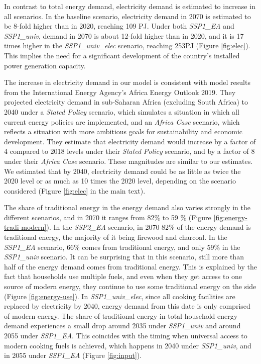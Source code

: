 \documentclass[
]{article}
\begin{document}
In contrast to total energy demand, electricity demand is estimated to increase in all scenarios. In the baseline scenario, electricity demand in 2070 is estimated to be 8-fold higher than in 2020, reaching 109 PJ. Under both \emph{SSP1\_EA} and \emph{SSP1\_univ}, demand in 2070 is about 12-fold higher than in 2020, and it is 17 times higher in the \emph{SSP1\_univ\_elec} scenario, reaching 253PJ (Figure \ref{fig:elec}). This implies the need for a significant development of the country's installed power generation capacity.

The increase in electricity demand in our model is consistent with model results from the International Energy Agency's Africa Energy Outlook 2019. They projected electricity demand in sub-Saharan Africa (excluding South Africa) to 2040 under a \emph{Stated Policy} scenario, which simulates a situation in which all current energy policies are implemented, and an \emph{Africa Case} scenario, which reflects a situation with more ambitious goals for sustainability and economic development. They estimate that electricity demand would increase by a factor of 4 compared to 2018 levels under their \emph{Stated Policy} scenario, and by a factor of 8 under their \emph{Africa Case} scenario. These magnitudes are similar to our estimates. We estimated that by 2040, electricity demand could be as little as twice the 2020 level or as much as 10 times the 2020 level, depending on the scenario considered (Figure \ref{fig:elec} in the main text).

The share of traditional energy in the energy demand also varies strongly in the different scenarios, and in 2070 it ranges from 82\% to 59 \% (Figure \ref{fig:energy-tradi-modern}). In the \emph{SSP2\_EA} scenario, in 2070 82\% of the energy demand is traditional energy, the majority of it being firewood and charcoal. In the \emph{SSP1\_EA} scenario, 66\% comes from traditional energy, and only 59\% in the \emph{SSP1\_univ} scenario. It can be surprising that in this scenario, still more than half of the energy demand comes from traditional energy. This is explained by the fact that households use multiple fuels, and even when they get access to one source of modern energy, they continue to use some traditional energy on the side (Figure \ref{fig:energy-use}). In \emph{SSP1\_univ\_elec}, since all cooking facilities are replaced by electricity by 2040, energy demand from this date is only comprised of modern energy. The share of traditional energy in total household energy demand experiences a small drop around 2035 under \emph{SSP1\_univ} and around 2055 under \emph{SSP1\_EA}. This coincides with the timing when universal access to modern cooking fuels is achieved, which happens in 2040 under \emph{SSP1\_univ}, and in 2055 under \emph{SSP1\_EA} (Figure \ref{fig:input}).
\end{document}
